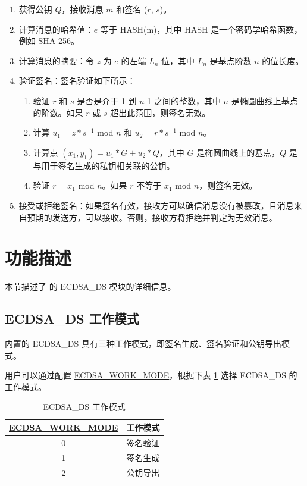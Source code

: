 \documentclass[main\_\_CN.tex]{subfiles}
\begin{document}
\begin{enumerate}
    \item 获得公钥 $Q$，接收消息 $m$ 和签名 ($r$, $s$)。
    \item 计算消息的哈希值：$e$ 等于 HASH(m)，其中 HASH 是一个密码学哈希函数，例如 SHA-256。
    \item 计算消息的摘要：令 $z$ 为 $e$ 的左端 $L_n$ 位，其中 $L_n$ 是基点阶数 $n$ 的位长度。
    \item 验证签名：签名验证如下所示：
        \begin{enumerate}
            \item 验证 $r$ 和 $s$ 是否是介于 1 到 $n$-1 之间的整数，其中 $n$ 是椭圆曲线上基点的阶数。如果 $r$ 或 $s$ 超出此范围，则签名无效。
            \item 计算 $u_1 = z * s^{-1}$ \textrm{mod} $n$ 和 $u_2 = r * s^{-1}$ \textrm{mod} $n$。
            \item 计算点 $(x_1, y_1) = u_1 * G + u_2 * Q$，其中 $G$ 是椭圆曲线上的基点，$Q$ 是与用于签名生成的私钥相关联的公钥。
            \item 验证 $r = x_1$ \textrm{mod} $n$。如果 $r$ 不等于 $x_1$ \textrm{mod} $n$，则签名无效。
        \end{enumerate}
    \item 接受或拒绝签名：如果签名有效，接收方可以确信消息没有被篡改，且消息来自预期的发送方，可以接收。否则，接收方将拒绝并判定为无效消息。
\end{enumerate}

\section{功能描述}

本节描述了 \chipname{} 的 ECDSA\_DS 模块的详细信息。

\subsection{ECDSA\_DS 工作模式}

\chipname{} 内置的 ECDSA\_DS 具有三种工作模式，即签名生成、签名验证和公钥导出模式。

用户可以通过配置 \hyperref[fielddesc:ECDSAWORKMODE]{ECDSA\_WORK\_MODE}，根据下表 \ref{tab:ecdsa-working-mode} 选择 ECDSA\_DS 的工作模式。

\begin{table}[H]
    \centering
    \caption{ECDSA\_DS 工作模式}
    \label{tab:ecdsa-working-mode}
    \begin{tabular}{ | c | l | }
    \hline
        \rowcolor{lightgray}
        \textbf{\hyperref[fielddesc:ECDSAWORKMODE]{ECDSA\_WORK\_MODE}}      & \textbf{工作模式}\\\hline
        0                       & 签名验证  \\\hline
        1                       & 签名生成     \\\hline
        2                       & 公钥导出         \\\hline
    \end{tabular}
\end{table}
\end{document}
